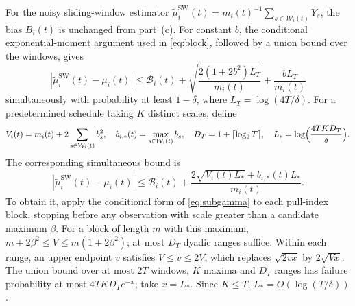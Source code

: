 For the noisy sliding-window estimator $\widetilde\mu_i^{\mathrm{SW}}(t)=m_i(t)^{-1}\sum_{s\in\mathcal W_i(t)}Y_s$, the bias $B_i(t)$ is unchanged from part~(c). For constant $b$, the conditional exponential-moment argument used in \eqref{eq:block}, followed by a union bound over the windows, gives
\begin{equation}\label{eq:noisy_sw}
|\widetilde\mu_i^{\mathrm{SW}}(t)-\mu_i(t)|\le\mathcal B_i(t)+\sqrt{\frac{2(1+2b^2)L_T}{m_i(t)}}+\frac{bL_T}{m_i(t)}
\end{equation}
simultaneously with probability at least $1-\delta$, where $L_T=\log(4T/\delta)$. For a predetermined schedule taking $K$ distinct scales, define
\[
V_i(t)=m_i(t)+2\sum_{s\in\mathcal W_i(t)}b_s^2,\quad b_{i,*}(t)=\max_{s\in\mathcal W_i(t)}b_s,\quad D_T=1+\lceil\log_2T\rceil,\quad L_*=\log\Bigl(\frac{4TKD_T}\delta\Bigr).
\]
The corresponding simultaneous bound is
\begin{equation}\label{eq:noisy_sw_tv}
|\widetilde\mu_i^{\mathrm{SW}}(t)-\mu_i(t)|\le\mathcal B_i(t)+\frac{2\sqrt{V_i(t)L_*}+b_{i,*}(t)L_*}{m_i(t)}.
\end{equation}
To obtain it, apply the conditional form of \eqref{eq:subgamma} to each pull-index block, stopping before any observation with scale greater than a candidate maximum $\beta$. For a block of length $m$ with this maximum, $m+2\beta^2\le V\le m(1+2\beta^2)$; at most $D_T$ dyadic ranges suffice. Within each range, an upper endpoint $v$ satisfies $V\le v\le2V$, which replaces $\sqrt{2vx}$ by $2\sqrt{Vx}$. The union bound over at most $2T$ windows, $K$ maxima and $D_T$ ranges has failure probability at most $4TKD_Te^{-x}$; take $x=L_*$. Since $K\le T$, $L_*=O(\log(T/\delta))$.

